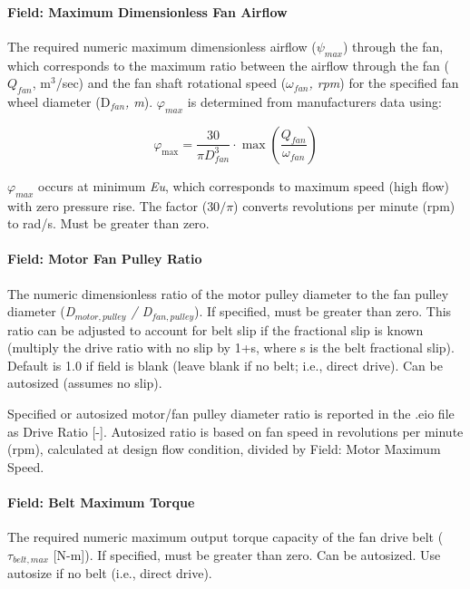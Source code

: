 \paragraph{Field: Maximum Dimensionless Fan Airflow}\label{field-maximum-dimensionless-fan-airflow}

The required numeric maximum dimensionless airflow (\(\psi_{max}\)) through the fan, which corresponds to the maximum ratio between the airflow through the fan (\(Q_{fan}\), m\(^{3}\)/sec) and the fan shaft rotational speed (\(\omega_{fan}\)\emph{, rpm}) for the specified fan wheel diameter (D\(_{fan}\)\emph{, m}). \(\varphi_{max}\) is determined from manufacturers data using:

\begin{equation}
\varphi_{\max} = \frac{30}{\pi D_{fan}^3} \cdot \max \left( \frac{Q_{fan}}{\omega_{fan}} \right)
\end{equation}

\(\varphi_{max}\) occurs at minimum \emph{Eu}, which corresponds to maximum speed (high flow) with zero pressure rise. The factor (\(30/\pi\)) converts revolutions per minute (rpm) to rad/s. Must be greater than zero.

\paragraph{Field: Motor Fan Pulley Ratio}\label{field-motor-fan-pulley-ratio}

The numeric dimensionless ratio of the motor pulley diameter to the fan pulley diameter (\emph{D\(_{motor,pulley}\) / D\(_{fan,pulley}\)}). If specified, must be greater than zero. This ratio can be adjusted to account for belt slip if the fractional slip is known (multiply the drive ratio with no slip by 1+s, where s is the belt fractional slip). Default is 1.0 if field is blank (leave blank if no belt; i.e., direct drive). Can be autosized (assumes no slip).

Specified or autosized motor/fan pulley diameter ratio is reported in the .eio file as Drive Ratio {[}-{]}. Autosized ratio is based on fan speed in revolutions per minute (rpm), calculated at design flow condition, divided by Field: Motor Maximum Speed.

\paragraph{Field: Belt Maximum Torque}\label{field-belt-maximum-torque}

The required numeric maximum output torque capacity of the fan drive belt (\(\tau_{belt,max}\) {[}N-m{]}). If specified, must be greater than zero. Can be autosized. Use autosize if no belt (i.e., direct drive).

